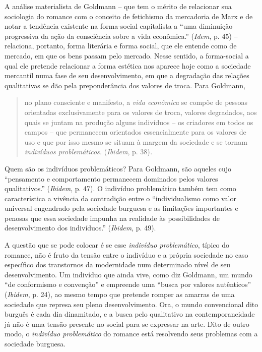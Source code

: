 A análise materialista de Goldmann -- que tem o mérito de relacionar sua
sociologia do romance com o conceito de fetichismo da mercadoria de Marx
e de notar a tendência existente na forma-social capitalista a ``uma
diminuição progressiva da ação da consciência sobre a vida econômica.''
(\emph{Idem}, p. 45) -- relaciona, portanto, forma literária e forma
social, que ele entende como de mercado, em que os bens passam pelo
mercado. Nesse sentido, a forma-social a qual ele pretende relacionar a
forma estética nos aparece hoje como a sociedade mercantil numa fase de
seu desenvolvimento, em que a degradação das relações qualitativas se
dão pela preponderância dos valores de troca. Para Goldmann,

\begin{quote}
no plano consciente e manifesto, a \emph{vida econômica} se compõe de
pessoas orientadas exclusivamente para os valores de troca, valores
degradados, aos quais se juntam na produção alguns indivíduos -- os
criadores em todos os campos -- que permanecem orientados essencialmente
para os valores de uso e que por isso mesmo se situam à margem da
sociedade e se tornam \emph{indivíduos problemáticos.} (\emph{Ibidem},
p. 38)\emph{.}
\end{quote}

Quem são os indivíduos problemáticos? Para Goldmann, são aqueles cujo
``pensamento e comportamento permanecem dominados pelos valores
qualitativos.'' (\emph{Ibidem}, p. 47). O indivíduo problemático também
tem como característica a vivência da contradição entre o
``individualismo como valor universal engendrado pela sociedade burguesa
e as limitações importantes e penosas que essa sociedade impunha na
realidade às possibilidades de desenvolvimento dos indivíduos.''
(\emph{Ibidem}, p. 49).

A questão que se pode colocar é se esse \emph{indivíduo problemático},
típico do romance, não é fruto da tensão entre o indivíduo e a própria
sociedade no caso específico dos transtornos da modernidade num
determinado nível de seu desenvolvimento. Um indivíduo que ainda vive,
como diz Goldmann, um mundo ``de conformismo e convenção'' e empreende
uma ``busca por valores autênticos'' (\emph{Ibidem}, p. 24), ao mesmo
tempo que pretende romper as amarras de uma sociedade que represa seu
pleno desenvolvimento. Ora, o mundo convencional dito burguês é cada dia
dinamitado, e a busca pelo qualitativo na contemporaneidade já não é uma
tensão presente no social para se expressar na arte. Dito de outro modo,
o \emph{indivíduo problemático} do romance está resolvendo seus
problemas com a sociedade burguesa.

